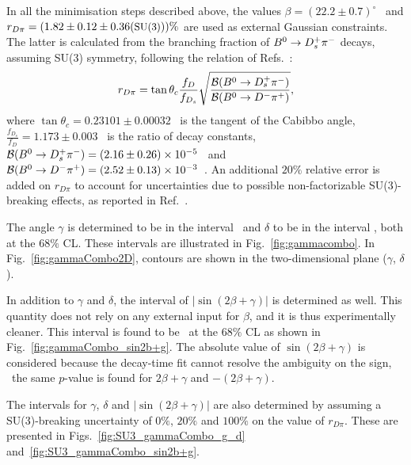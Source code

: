 In all the minimisation steps described above, the values $\beta=(22.2 \pm 0.7)^{\circ}$~\cite{HFAG} and
$r_{D\pi}=(1.82 \pm 0.12 \pm 0.36(\textrm{\small{SU(3)}}))\%$ are used as external Gaussian constraints. 
The latter is calculated from the branching fraction
of $B^0 \rightarrow D^+_s \pi^-$ decays, assuming SU(3) symmetry, following the relation of Refs.~\cite{Das:2010be,Aubert:2008zi}:
\begin{equation}
\label{eq:rdpi_1}
r_{D\pi}= \tan \theta_c  \frac{f_{D}}{f_{D_s}}\sqrt{\frac{\mathcal{B}(B^0 \rightarrow D^+_s \pi^-)}{\mathcal{B}(B^0 \rightarrow D^- \pi^+)}},
\end{equation}
where $ \tan \theta_c= 0.23101 \pm 0.00032$~\cite{CKMfitter2015} is the tangent of the Cabibbo angle,
$\frac{f_{D_s}}{f_{D}}= 1.173 \pm 0.003$~\cite{Aoki:2016frl,Bazavov:2014wgs,Carrasco:2014poa} is the ratio of decay constants,
$\mathcal{B}(B^0 \rightarrow D^+_s \pi^-)=(2.16 \pm 0.26)\times10^{-5}$~\cite{PDG} and $\mathcal{B}(B^0 \rightarrow D^- \pi^+)=(2.52 \pm 0.13)\times10^{-3}$~\cite{PDG}.
 An additional $20\%$ relative error is added on $r_{D\pi}$ to account for
uncertainties due to  possible non-factorizable SU(3)-breaking effects, as reported in Ref.~\cite{DeBruyn:2012jp}.

The angle $\gamma$ is determined to be in the interval \gammaCL~and $\delta$ to be in the interval \deltaCL, both at the $68\%$ CL. These intervals are illustrated in Fig.~\ref{fig:gammacombo}.
In Fig.~\ref{fig:gammaCombo2D}, contours are shown in the two-dimensional plane ($\gamma$, $\delta$). 

In addition to $\gamma$ and $\delta$, the interval
of $|\sin(2\beta +\gamma)|$ is determined as well. This quantity does not rely on any external input for $\beta$, and it is thus experimentally
cleaner. This interval is found
to be \magSinTwoBplusGCL~at the $68\%$ CL as shown in Fig.~\ref{fig:gammaCombo_sin2b+g}.
The absolute value of $\sin(2\beta +\gamma)$ is considered because the decay-time fit cannot resolve the ambiguity on the sign, \ie~the 
same $p$-value is found for $2\beta +\gamma$ and $-(2\beta +\gamma)$. 

The intervals for $\gamma$, $\delta$ and $|\sin(2\beta +\gamma)|$ are also determined by assuming a SU(3)-breaking uncertainty of $0\%$, $20\%$ and $100\%$
on the value of $r_{D\pi}$. These are presented in
Figs.~\ref{fig:SU3_gammaCombo_g_d} and~\ref{fig:SU3_gammaCombo_sin2b+g}.


